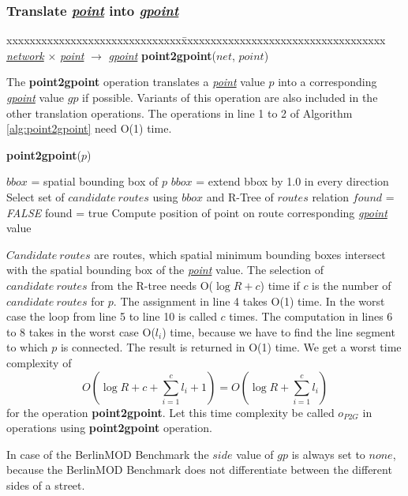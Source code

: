 \documentclass[a4paper]{article}
\newcommand{\bmodb} {BerlinMOD Benchmark}
\newcommand{\op}[1]{\textbf{#1}}
\newcommand{\dt}[1]{\textsl{\underline{#1}}}
\newcommand{\false}{\textsl{FALSE}}
\begin{document}
\subsubsection{Translate \dt{point} into \dt{gpoint}}
\begin{tabbing}
xxxxxxxxxxxxxxxxxxxxxxxxxxxxxx\=xxxxxxxxxxxxxxxxxxxxxxxxxxxxxxxxxxx\kill
\dt{network} $\times$ \dt{point} $\rightarrow$ \dt{gpoint} \> \op{point2gpoint}($net$, $point$)\\
\end{tabbing}
The \op{point2gpoint} operation translates a \dt{point} value $p$ into a
corresponding \dt{gpoint} value $gp$ if possible. Variants of this operation are
also included in the other translation operations. The operations in line 1 to 2 of
Algorithm \ref{alg:point2gpoint} need O(1) time.
\begin{algorithm}[H]
  \caption{\op{point2gpoint}($p$)}
  \label{alg:point2gpoint}
  \begin{algorithmic}[1]
    \STATE $bbox$ = spatial bounding box of $p$
    \STATE $bbox$ = extend bbox by 1.0 in every direction
    \STATE Select set of $candidate\ routes$ using $bbox$ and R-Tree of $routes$ relation
    \STATE $found$ = \false{}
        \STATE found = true
        \STATE Compute position of point on route
      \ENDIF
    \ENDWHILE
    \RETURN corresponding \dt{gpoint} value
  \end{algorithmic}
\end{algorithm}
$Candidate\ routes$ are routes, which spatial minimum bounding boxes intersect
with the spatial bounding box of the \dt{point} value.
The selection of $candidate\ routes$ from the R-tree needs O($\log R + c$) time
if $c$ is the number of $candidate\ routes$ for $p$.
The assignment in line 4 takes O(1) time.
In the worst case the loop from line 5 to line 10 is called $c$ times.
The computation in lines 6 to 8 takes in the worst case O($l_i$) time, because
we have to find the line segment to which $p$ is connected. The result
is returned in O(1) time. We get a worst time complexity of
\[O(\log R + c + \sum_{i=1}^{c}{l_i} + 1) = O(\log R + \sum_{i=1}^{c}{l_i})\]
for the operation \op{point2gpoint}. Let this time complexity be called $o_{P2G}$ in operations using \op{point2gpoint} operation.

In case of the \bmodb{} the $side$ value of $gp$ is always set to $none$,
because the \bmodb{} does not differentiate between the different sides of a street.
\end{document}

